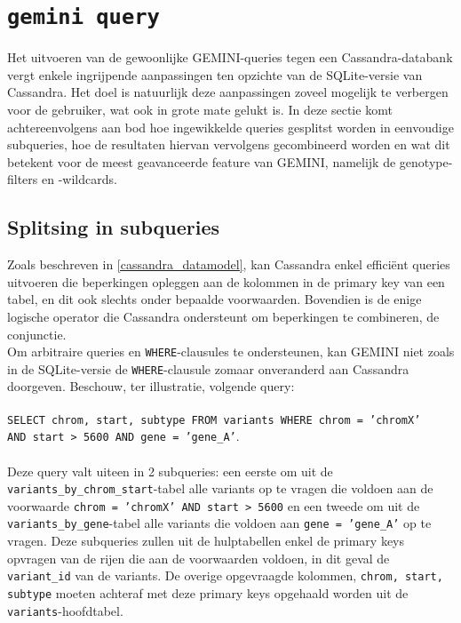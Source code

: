 \section{\texttt{gemini query}}
\label{gemini_query_concept}
Het uitvoeren van de gewoonlijke GEMINI-queries tegen een Cassandra-databank vergt enkele ingrijpende aanpassingen ten opzichte van de SQLite-versie van Cassandra. Het doel is natuurlijk deze aanpassingen zoveel mogelijk te verbergen voor de gebruiker, wat ook in grote mate gelukt is. In deze sectie komt achtereenvolgens aan bod hoe ingewikkelde queries gesplitst worden in eenvoudige subqueries, hoe de resultaten hiervan vervolgens gecombineerd worden en wat dit betekent voor de meest geavanceerde feature van GEMINI, namelijk de genotype-filters en -wildcards.

\subsection{Splitsing in subqueries}
\label{splitsing_subqueries_conceptueel}

Zoals beschreven in \ref{cassandra_datamodel}, kan Cassandra enkel effici\"ent queries uitvoeren die beperkingen opleggen aan de kolommen in de primary key van een tabel, en dit ook slechts onder bepaalde voorwaarden. Bovendien is de enige logische operator die Cassandra ondersteunt om beperkingen te combineren, de conjunctie.\\
Om arbitraire queries en \texttt{WHERE}-clausules te ondersteunen, kan GEMINI niet zoals in de SQLite-versie de \texttt{WHERE}-clausule zomaar onveranderd aan Cassandra doorgeven. Beschouw, ter illustratie, volgende query:\\\\
\texttt{SELECT chrom, start, subtype FROM variants WHERE chrom = 'chromX' \\AND start > 5600 AND gene = 'gene\_A'}.\\\\
Deze query valt uiteen in 2 subqueries: een eerste om uit de \texttt{variants\_by\_chrom\_start}-tabel alle variants op te vragen die voldoen aan de voorwaarde \texttt{chrom = 'chromX' AND start > 5600} en een tweede om uit de \texttt{variants\_by\_gene}-tabel alle variants die voldoen aan \texttt{gene = 'gene\_A'} op te vragen. Deze subqueries zullen uit de hulptabellen enkel de primary keys opvragen van de rijen die aan de voorwaarden voldoen, in dit geval de \texttt{variant\_id} van de variants. De overige opgevraagde kolommen, \texttt{chrom, start, subtype} moeten achteraf met deze primary keys opgehaald worden uit de \texttt{variants}-hoofdtabel.\\

